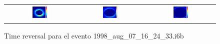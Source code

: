 \begin{figure}[H]
\begin{tabular}{ccc}
	\includegraphics[width=0.3\textwidth]{linea_timerev/figuras/timereversal/ev2/tr236.png}&
	\includegraphics[width=0.3\textwidth]{linea_timerev/figuras/timereversal/ev2/tr237.png}&
	\includegraphics[width=0.3\textwidth]{linea_timerev/figuras/timereversal/ev2/tr238.png}\\
\end{tabular}
\caption{Time reversal para el evento 1998\_aug\_07\_16\_24\_33.i6b}
\end{figure}

